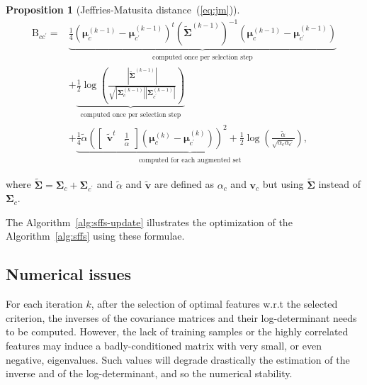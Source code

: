 \documentclass[journal]{IEEEtran}
\newtheorem{prop}{Proposition}
\begin{document}
      \begin{prop}[Jeffries-Matusita distance~(\ref{eq:jm})]
      \begin{align}
        \label{eq:jm-update}
            \text{B}_{cc^\prime} = &\underbrace{\frac{1}{4} (\boldsymbol{\mu}_c^{(k-1)} - \boldsymbol{\mu}_{c^\prime}^{(k-1)})^t ( \boldsymbol{\tilde{\Sigma}}^{(k-1)} )^{-1} (\boldsymbol{\mu}_c^{(k-1)} - \boldsymbol{\mu}_{c^\prime}^{(k-1)})}_{\substack{\text{computed once per selection step}}} \nonumber \\
            &+ \underbrace{\frac{1}{2} \log \left( \frac{|\boldsymbol{\tilde{\Sigma}}^{(k-1)}|}{\sqrt{|\boldsymbol{\Sigma}_c^{(k-1)}| |\boldsymbol{\Sigma}_{c^\prime}^{(k-1)}|}} \right)}_{\substack{\text{computed once per selection step}}} \nonumber \\
            &+ \underbrace{\frac{1}{4} \tilde{\alpha} ( \left[\begin{array}{cc} \mathbf{\tilde{v}}^t & \frac{1}{\tilde{\alpha}} \end{array}\right] (\boldsymbol{\mu}_c^{(k)} - \boldsymbol{\mu}_{c^\prime}^{(k)}) )^2 + \frac{1}{2} \log \left( \frac{\tilde{\alpha}}{\sqrt{\alpha_c \alpha_{c^\prime}}} \right)}_{\substack{\text{computed for each augmented set}}},
      \end{align}
    \end{prop}
    \noindent where $\boldsymbol{\tilde{\Sigma}} = \boldsymbol{\Sigma}_c + \boldsymbol{\Sigma}_{c^\prime}$ and $\tilde{\alpha}$ and $\mathbf{\tilde{v}}$ are defined as $\alpha_c$ and $\mathbf{v}_c$ but using $\boldsymbol{\tilde{\Sigma}}$ instead of $\boldsymbol{\Sigma}_c$.
    
    The  Algorithm~\ref{alg:sffs-update} illustrates  the optimization
    of the Algorithm~\ref{alg:sffs} using these formulae.

    \subsection{Numerical issues}
    For each  iteration $k$, after  the selection of  optimal features
    w.r.t  the  selected criterion,  the  inverses  of the  covariance
    matrices and their log-determinant  needs to be computed. However,
    the lack of training samples or the highly correlated features may
    induce  a  badly-conditioned  matrix  with  very  small,  or  even
    negative, eigenvalues.   Such values will degrade  drastically the
    estimation of the  inverse and of the log-determinant,  and so the
    numerical stability.
\end{document}
